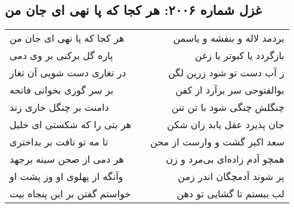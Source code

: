 \begin{center}
\section*{غزل شماره ۲۰۰۶: هر کجا که پا نهی ای جان من}
\label{sec:2006}
\begin{longtable}{l p{0.5cm} r}
هر کجا که پا نهی ای جان من
&&
بردمد لاله و بنفشه و یاسمن
\\
پاره گل برکنی بر وی دمی
&&
بازگردد یا کبوتر یا زغن
\\
در تغاری دست شویی آن تغار
&&
ز آب دست تو شود زرین لگن
\\
بر سر گوری بخوانی فاتحه
&&
بوالفتوحی سر برآرد از کفن
\\
دامنت بر چنگل خاری زند
&&
چنگلش چنگی شود با تن تنن
\\
هر بتی را که شکستی ای خلیل
&&
جان پذیرد عقل یابد زان شکن
\\
تا مه تو تافت بر بداختری
&&
سعد اکبر گشت و وارست از محن
\\
هر دمی از صحن سینه برجهد
&&
همچو آدم زاده‌ای بی‌مرد و زن
\\
وآنگه از پهلوی او وز پشت او
&&
پر شوند آدمچگان اندر زمن
\\
خواستم گفتن بر این پنجاه بیت
&&
لب ببستم تا گشایی تو دهن
\\
\end{longtable}
\end{center}
